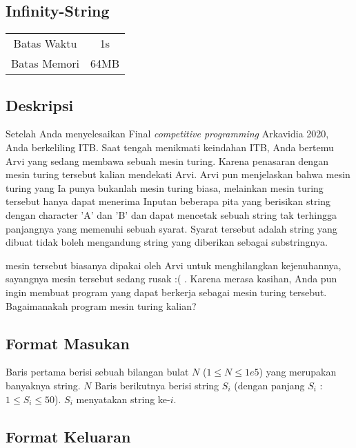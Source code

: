 \documentclass{article}
\begin{document}
\begin{center}
    \section*{Infinity-String} %

    \begin{tabular}{ | c c | }
        \hline
        Batas Waktu  & 1s \\    %
        Batas Memori & 64MB \\  %
        \hline
    \end{tabular}
\end{center}

\subsection*{Deskripsi}

Setelah Anda menyelesaikan Final \textit{competitive programming} Arkavidia 2020, Anda berkeliling ITB. Saat tengah menikmati keindahan ITB, Anda bertemu
Arvi yang sedang membawa sebuah mesin turing. Karena penasaran dengan mesin turing tersebut kalian mendekati Arvi. Arvi pun menjelaskan bahwa mesin turing
yang Ia punya bukanlah mesin turing biasa, melainkan mesin turing tersebut hanya dapat menerima Inputan beberapa pita yang berisikan string dengan 
character 'A' dan 'B' dan dapat mencetak sebuah string tak terhingga panjangnya yang memenuhi sebuah syarat. Syarat tersebut adalah string yang dibuat tidak boleh
mengandung string yang diberikan sebagai substringnya.

mesin tersebut biasanya dipakai oleh Arvi untuk menghilangkan kejenuhannya, sayangnya mesin tersebut sedang rusak :( . Karena merasa kasihan, Anda pun
ingin membuat program yang dapat berkerja sebagai mesin turing tersebut. Bagaimanakah program mesin turing kalian?  

\subsection*{Format Masukan}

Baris pertama berisi sebuah bilangan bulat $N$ ($1 \leq N \leq 1e5$) yang merupakan banyaknya string.
$N$ Baris berikutnya berisi string $S_i$ (dengan panjang $S_i$ : $1 \leq S_i \leq 50$). $S_i$ menyatakan string ke-$i$.

\subsection*{Format Keluaran}
\end{document}
